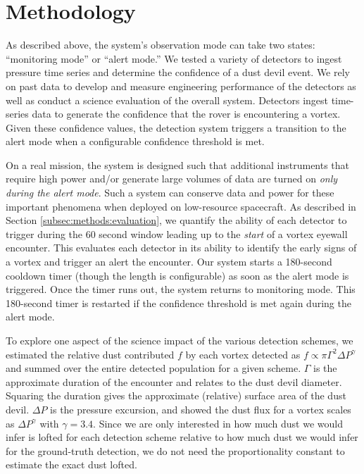 \section{Methodology}

As described above, the system's observation mode can take two states: ``monitoring mode'' or ``alert mode.'' 
We tested a variety of detectors to ingest pressure time series and determine the confidence of a dust devil event. 
We rely on past data to develop and measure engineering performance of the detectors as well as conduct a science evaluation of the overall system.
Detectors ingest time-series data to generate the confidence that the rover is encountering a vortex.
Given these confidence values, the detection system triggers a transition to the alert mode when a configurable confidence threshold is met. 

On a real mission, the system is designed such that additional instruments that require high power and/or generate large volumes of data are turned on \textit{only during the alert mode}.
Such a system can conserve data and power for these important phenomena when deployed on low-resource spacecraft.
As described in Section \ref{subsec:methods:evaluation}, we quantify the ability of each detector to trigger during the 60 second window leading up to the \textit{start} of a vortex eyewall encounter. 
This evaluates each detector in its ability to identify the early signs of a vortex and trigger an alert  the encounter.
Our system starts a 180-second cooldown timer (though the length is configurable) as soon as the alert mode is triggered. 
Once the timer runs out, the system returns to monitoring mode. 
This 180-second timer is restarted if the confidence threshold is met again during the alert mode.

To explore one aspect of the science impact of the various detection schemes, we estimated the relative dust contributed $f$ by each vortex detected as $f \propto \pi \Gamma^2 \Delta P^\gamma$ and summed over the entire detected population for a given scheme. $\Gamma$ is the approximate duration of the encounter and relates to the dust devil diameter. Squaring the duration gives the approximate (relative) surface area of the dust devil. $\Delta P$ is the pressure excursion, and \citet{Neakreas2010} showed the dust flux for a vortex scales as $\Delta P^\gamma$ with $\gamma = 3.4$. Since we are only interested in how much dust we would infer is lofted for each detection scheme relative to how much dust we would infer for the ground-truth detection, we do not need the proportionality constant to estimate the exact dust lofted.


